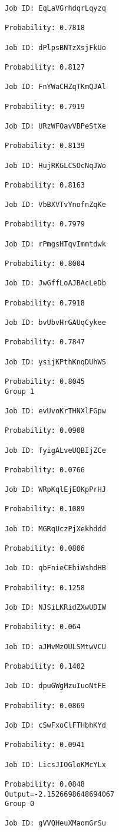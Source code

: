 \documentclass[11pt]{article}
\begin{document}
\begin{Verbatim}[commandchars=\\\{\}]
Job ID: EqLaVGrhdqrLqyzq

Probability: 0.7818

Job ID: dPlpsBNTzXsjFkUo

Probability: 0.8127

Job ID: FnYWaCHZqTKmQJAl

Probability: 0.7919

Job ID: URzWFOavVBPeStXe

Probability: 0.8139

Job ID: HujRKGLCSOcNqJWo

Probability: 0.8163

Job ID: VbBXVTvYnofnZqKe

Probability: 0.7979

Job ID: rPmgsHTqvImmtdwk

Probability: 0.8004

Job ID: JwGffLoAJBAcLeDb

Probability: 0.7918

Job ID: bvUbvHrGAUqCykee

Probability: 0.7847

Job ID: ysijKPthKnqDUhWS

Probability: 0.8045
Group 1

Job ID: evUvoKrTHNXlFGpw

Probability: 0.0908

Job ID: fyigALveUQBIjZCe

Probability: 0.0766

Job ID: WRpKqlEjEOKpPrHJ

Probability: 0.1089

Job ID: MGRqUczPjXekhddd

Probability: 0.0806

Job ID: qbFnieCEhiWshdHB

Probability: 0.1258

Job ID: NJSiLKRidZXwUDIW

Probability: 0.064

Job ID: aJMvMzOULSMtwVCU

Probability: 0.1402

Job ID: dpuGWgMzuIuoNtFE

Probability: 0.0869

Job ID: cSwFxoClFTHbhKYd

Probability: 0.0941

Job ID: LicsJIOGloKMcYLx

Probability: 0.0848
Output=-2.1526698648694067
Group 0

Job ID: gVVQHeuXMaomGrSu


\end{Verbatim}
\end{document}
